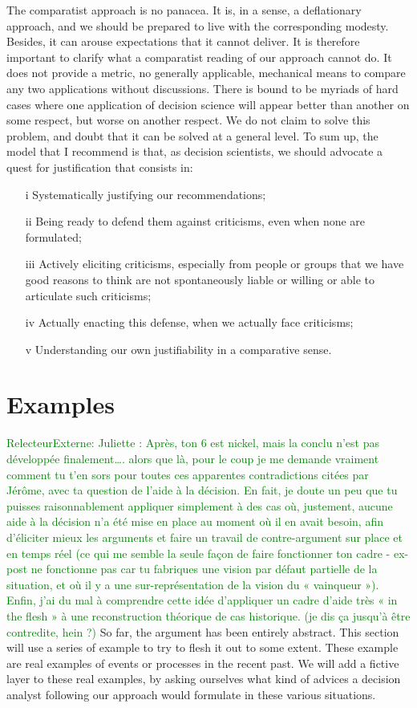 \documentclass[preprint,11pt]{elsarticle}
\newcommand{\commentE}[1]{\textcolor{green}{RelecteurExterne: #1}}
\begin{document}
The comparatist approach is no panacea. It is, in a sense, a deflationary approach, and we should be prepared to live with the corresponding modesty. Besides, it can arouse expectations that it cannot deliver. It is therefore important to clarify what a comparatist reading of our approach cannot do. It does not provide a metric, no generally applicable, mechanical means to compare any two applications without discussions. There is bound to be myriads of hard cases where one application of decision science will appear better than another on some respect, but worse on another respect. We do not claim to solve this problem, and doubt that it can be solved at a general level.
To sum up, the model that I recommend is that, as decision scientists, we should advocate a quest for justification that consists in:
\begin{itemize}
\item[i]	Systematically justifying our recommendations;
\item[ii]	Being ready to defend them against criticisms, even when none are formulated;
\item[iii]	Actively eliciting criticisms, especially from people or groups that we have good reasons to think are not spontaneously liable or willing or able to articulate such criticisms;
\item[iv]	Actually enacting this defense, when we actually face criticisms;
\item[v]	Understanding our own justifiability in a comparative sense.
\end{itemize}

\section{Examples}
\commentE{Juliette : Après, ton 6 est nickel, mais la conclu n’est pas développée finalement…. alors que là, pour le coup je me demande vraiment comment tu t’en sors pour toutes ces apparentes contradictions citées par Jérôme, avec ta question de l’aide à la décision. 
En fait, je doute un peu que tu puisses raisonnablement appliquer simplement à des cas où, justement, aucune aide à la décision n’a été mise en place au moment où il en avait besoin, afin d’éliciter mieux les arguments et faire un travail de contre-argument sur place et en temps réel (ce qui me semble la seule façon de faire fonctionner ton cadre - ex-post ne fonctionne pas car tu fabriques une vision par défaut partielle de la situation, et où il y a une sur-représentation de la vision du « vainqueur »). Enfin, j’ai du mal à comprendre cette idée d’appliquer un cadre d’aide très « in the flesh » à une reconstruction théorique de cas historique. (je dis ça jusqu’à être contredite, hein ?)
}
So far, the argument has been entirely abstract. This section will use a series of example to try to flesh it out to some extent. These example are real examples of events or processes in the recent past. We will add a fictive layer to these real examples, by asking ourselves what kind of advices a decision analyst following our approach would formulate in these various situations.
\end{document}
